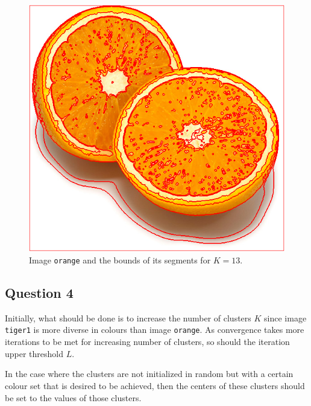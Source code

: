 {\begin{minipage}{\linewidth}
\begin{minipage}{0.45\linewidth}
\begin{figure}[H]
      \includegraphics[scale=0.36]{./images/01/kmeans2_13.png}
      \caption{Image \texttt{orange} and the bounds of its segments for $K=13$.}
      \label{fig:Q3:kmeans2_13}
    \end{figure}
  \end{minipage}
\end{minipage}
}

\subsection{Question 4}

Initially, what should be done is to increase the number of clusters $K$ since
image \texttt{tiger1} is more diverse in colours than image \texttt{orange}.
As convergence takes more iterations to be met for increasing number of clusters,
so should the iteration upper threshold $L$.

In the case where the clusters are not initialized in random but with a
certain colour set that is desired to be achieved, then the centers of these
clusters should be set to the values of those clusters.
